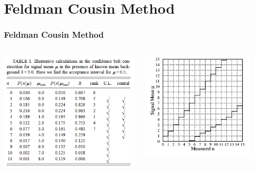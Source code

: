 \documentclass[aspectratio=1610,brown]{beamer}
\begin{document}
\section{Feldman Cousin Method}
\begin{frame}
\frametitle{Feldman Cousin Method}
\begin{columns}
    \begin{column}{0.5\textwidth}
            \includegraphics[width=\columnwidth]{figure/fctable.png}
    \end{column}
    \begin{column}{0.5\textwidth}
        \includegraphics[width=\columnwidth]{figure/fc.png}
    \end{column}
\end{columns}
\end{frame}
\end{document}
